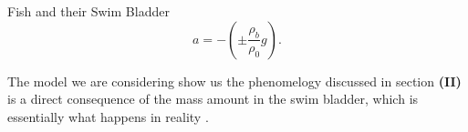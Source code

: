 \begin{section}{Fish and their Swim Bladder}
    \begin{equation}
        \label{fish_dynamics_02}
        a = - \left(\pm \frac{\rho_b}{\rho_0} g \right).
    \end{equation}
    
    The model we are considering show us the phenomelogy discussed in section \textbf{(II)} is a direct
    consequence of the mass amount in the swim bladder, which is essentially what happens in reality
    \cite{QUENTIN}.
    
\end{section}
